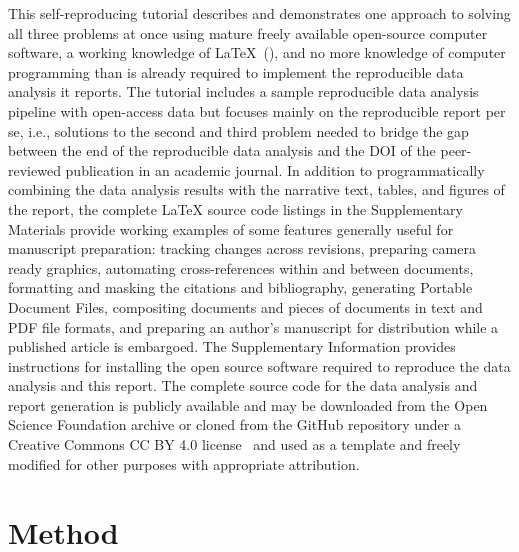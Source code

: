 \documentclass[helv,10pt,man,floatsintext]{apa6}  %
\begin{document}
This self-reproducing tutorial describes and demonstrates one approach
to solving all three problems at once using mature freely available
open-source computer software, a working knowledge of
\LaTeX{}~(\cite{latexproject}), and no more knowledge of computer
programming than is already required to implement the reproducible
data analysis it reports. The tutorial includes a sample reproducible
data analysis pipeline with open-access data but focuses mainly on the
reproducible report per se, i.e., solutions to the second and third
problem needed to bridge the gap between the end of the reproducible
data analysis and the DOI of the peer-reviewed publication in an
academic journal. In addition to programmatically combining the data
analysis results with the narrative text, tables, and figures of the
report, the complete \LaTeX{} source code listings in the
Supplementary Materials provide working examples of some features
generally useful for manuscript preparation: tracking changes across
revisions, preparing camera ready graphics, automating
cross-references within and between documents, formatting and masking
the citations and bibliography, generating Portable Document Files,
compositing documents and pieces of documents in text and PDF file
formats, and preparing an author's manuscript for distribution while a
published article is embargoed.  The Supplementary Information
provides instructions for installing the open source software required
to reproduce the data analysis and this report. The complete source
code for the data analysis and report generation is publicly available
and may be downloaded from the Open Science Foundation archive or
cloned from the GitHub repository under a Creative Commons CC BY 4.0
license~\cite{ccby4.0} and used as a template and freely modified for
other purposes with appropriate attribution.

\section{Method}
\end{document}
